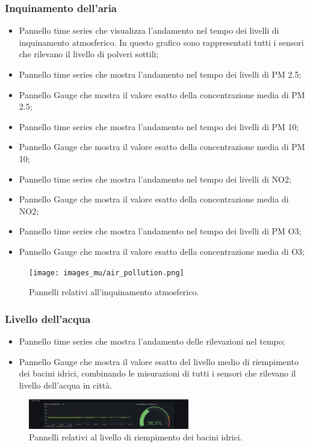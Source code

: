 \documentclass[8pt]{article}
\begin{document}
\subsubsection{Inquinamento dell'aria}
\begin{itemize}
\setlength\itemsep{0em}
    \item Pannello time series che visualizza l'andamento nel tempo dei livelli di inquinamento atmosferico. In questo grafico sono rappresentati tutti i sensori che rilevano il livello di polveri sottili;
    \item Pannello time series che mostra l'andamento nel tempo dei livelli di PM 2.5;
    \item Pannello Gauge che mostra il valore esatto della concentrazione media di PM 2.5;
    \item Pannello time series che mostra l'andamento nel tempo dei livelli di PM 10;
    \item Pannello Gauge che mostra il valore esatto della concentrazione media di PM 10;
    \item Pannello time series che mostra l'andamento nel tempo dei livelli di NO2;
    \item Pannello Gauge che mostra il valore esatto della concentrazione media di NO2;
    \item Pannello time series che mostra l'andamento nel tempo dei livelli di PM O3;
    \item Pannello Gauge che mostra il valore esatto della concentrazione media di O3;
\end{itemize}
\begin{figure}[H]
    \centering
    \texttt{[image: images\_mu/air\_pollution.png]}
    \caption{Pannelli relativi all'inquinamento atmosferico.}
    \label{fig:Pannelli relativi all'inquinamento atmosferico}
\end{figure}
\subsubsection{Livello dell'acqua}
\begin{itemize}
\setlength\itemsep{0em}
    \item Pannello time series che mostra l'andamento delle rilevazioni nel tempo;
    \item Pannello Gauge che mostra il valore esatto del livello medio di riempimento dei bacini idrici, combinando le misurazioni di tutti i sensori che rilevano il livello dell'acqua in città.
\end{itemize}
\begin{figure}[H]
    \centering
    \includegraphics[width=7cm]{images_mu/water_level.png}
    \caption{Pannelli relativi al livello di riempimento dei bacini idrici.}
    \label{fig:Pannelli relativi al livello di riempimento dei bacini idrici.}
\end{figure}
\end{document}
